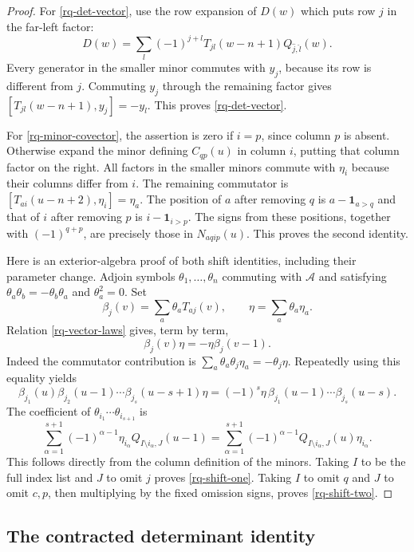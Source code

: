 \begin{proof}
For \eqref{rq-det-vector}, use the row expansion of
$D(w)$ which puts row $j$ in the far-left factor:
\[
 D(w)=\sum_l(-1)^{j+l}
                 T_{jl}(w-n+1)Q_{\widehat j,\widehat l}(w).
\]
Every generator in the smaller minor commutes with
$y_j$, because its row is different from $j$.
Commuting $y_j$ through the remaining factor gives
$[T_{jl}(w-n+1),y_j]=-y_l$.
This proves \eqref{rq-det-vector}.

For \eqref{rq-minor-covector}, the assertion is zero
if $i=p$, since column $p$ is absent.
Otherwise expand the minor defining $C_{qp}(u)$
in column $i$, putting that column factor on the right.
All factors in the smaller minors commute with
$\eta_i$ because their columns differ from $i$.
The remaining commutator is
$[T_{ai}(u-n+2),\eta_i]=\eta_a$.
The position of $a$ after removing $q$ is
$a-\mathbf1_{a>q}$ and that of $i$ after removing
$p$ is $i-\mathbf1_{i>p}$.
The signs from these positions, together with
$(-1)^{q+p}$, are precisely those in
$N_{aqip}(u)$.  This proves the second identity.

Here is an exterior-algebra proof of both shift
identities, including their parameter change.
Adjoin symbols $\theta_1,\ldots,\theta_n$ commuting
with $\mathcal A$ and satisfying
$\theta_a\theta_b=-\theta_b\theta_a$ and $\theta_a^2=0$.
Set
\[
 \beta_j(v)=\sum_a\theta_aT_{aj}(v),\qquad
                    \eta=\sum_a\theta_a\eta_a.
\]
Relation \eqref{rq-vector-laws} gives, term by term,
\[
                   \beta_j(v)\eta=-\eta\beta_j(v-1).
\]
Indeed the commutator contribution is
$\sum_a\theta_a\theta_j\eta_a=-\theta_j\eta$.
Repeatedly using this equality yields
\[
 \beta_{j_1}(u)\beta_{j_2}(u-1)\cdots
       \beta_{j_s}(u-s+1)\eta
   =(-1)^s\eta\,\beta_{j_1}(u-1)\cdots\beta_{j_s}(u-s).
\]
The coefficient of
$\theta_{i_1}\cdots\theta_{i_{s+1}}$ is
\begin{equation}\label{rq-general-shift}
 \sum_{\alpha=1}^{s+1}(-1)^{\alpha-1}
       \eta_{i_\alpha}Q_{I\setminus i_\alpha,J}(u-1)
  =
 \sum_{\alpha=1}^{s+1}(-1)^{\alpha-1}
       Q_{I\setminus i_\alpha,J}(u)\eta_{i_\alpha}.
\end{equation}
This follows directly from the column definition
of the minors.  Taking $I$ to be the full index
list and $J$ to omit $j$ proves
\eqref{rq-shift-one}.  Taking $I$ to omit $q$
and $J$ to omit $c,p$, then multiplying by the
fixed omission signs, proves \eqref{rq-shift-two}.
\end{proof}

\subsection{The contracted determinant identity}

